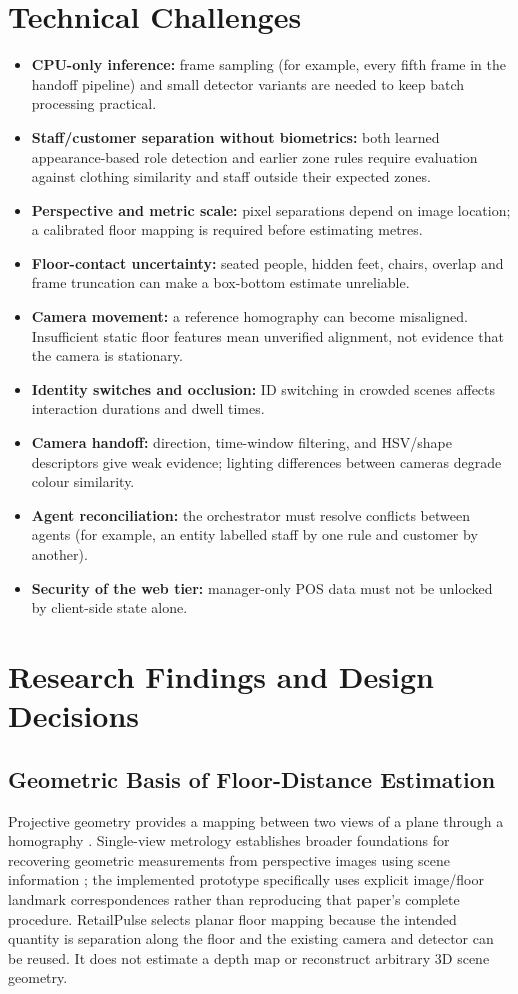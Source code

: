 \section{Technical Challenges}
\begin{itemize}
\item \textbf{CPU-only inference:} frame sampling (for example, every fifth frame in the handoff pipeline) and small detector variants are needed to keep batch processing practical.
\item \textbf{Staff/customer separation without biometrics:} both learned appearance-based role detection and earlier zone rules require evaluation against clothing similarity and staff outside their expected zones.
\item \textbf{Perspective and metric scale:} pixel separations depend on image location; a calibrated floor mapping is required before estimating metres.
\item \textbf{Floor-contact uncertainty:} seated people, hidden feet, chairs, overlap and frame truncation can make a box-bottom estimate unreliable.
\item \textbf{Camera movement:} a reference homography can become misaligned. Insufficient static floor features mean unverified alignment, not evidence that the camera is stationary.
\item \textbf{Identity switches and occlusion:} ID switching in crowded scenes affects interaction durations and dwell times.
\item \textbf{Camera handoff:} direction, time-window filtering, and HSV/shape descriptors give weak evidence; lighting differences between cameras degrade colour similarity.
\item \textbf{Agent reconciliation:} the orchestrator must resolve conflicts between agents (for example, an entity labelled staff by one rule and customer by another).
\item \textbf{Security of the web tier:} manager-only POS data must not be unlocked by client-side state alone.
\end{itemize}

\section{Research Findings and Design Decisions}
\subsection{Geometric Basis of Floor-Distance Estimation}
Projective geometry provides a mapping between two views of a plane through a homography \cite{hartley2004multiple,opencvHomography}. Single-view metrology establishes broader foundations for recovering geometric measurements from perspective images using scene information \cite{criminisi2000metrology}; the implemented prototype specifically uses explicit image/floor landmark correspondences rather than reproducing that paper's complete procedure. RetailPulse selects planar floor mapping because the intended quantity is separation along the floor and the existing camera and detector can be reused. It does not estimate a depth map or reconstruct arbitrary 3D scene geometry.

